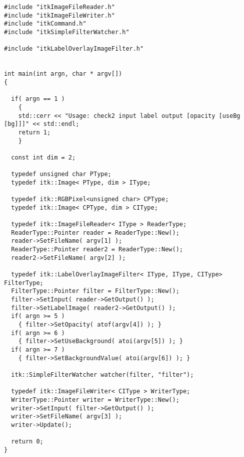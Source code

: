 \documentclass{InsightArticle}
\begin{document}
\small \begin{verbatim}
#include "itkImageFileReader.h"
#include "itkImageFileWriter.h"
#include "itkCommand.h"
#include "itkSimpleFilterWatcher.h"

#include "itkLabelOverlayImageFilter.h"


int main(int argn, char * argv[])
{

  if( argn == 1 )
    {
    std::cerr << "Usage: check2 input label output [opacity [useBg [bg]]]" << std::endl;
    return 1;
    }

  const int dim = 2;
  
  typedef unsigned char PType;
  typedef itk::Image< PType, dim > IType;

  typedef itk::RGBPixel<unsigned char> CPType;
  typedef itk::Image< CPType, dim > CIType;

  typedef itk::ImageFileReader< IType > ReaderType;
  ReaderType::Pointer reader = ReaderType::New();
  reader->SetFileName( argv[1] );
  ReaderType::Pointer reader2 = ReaderType::New();
  reader2->SetFileName( argv[2] );

  typedef itk::LabelOverlayImageFilter< IType, IType, CIType> FilterType;
  FilterType::Pointer filter = FilterType::New();
  filter->SetInput( reader->GetOutput() );
  filter->SetLabelImage( reader2->GetOutput() );
  if( argn >= 5 )
    { filter->SetOpacity( atof(argv[4]) ); }
  if( argn >= 6 )
    { filter->SetUseBackground( atoi(argv[5]) ); }
  if( argn >= 7 )
    { filter->SetBackgroundValue( atoi(argv[6]) ); }

  itk::SimpleFilterWatcher watcher(filter, "filter");

  typedef itk::ImageFileWriter< CIType > WriterType;
  WriterType::Pointer writer = WriterType::New();
  writer->SetInput( filter->GetOutput() );
  writer->SetFileName( argv[3] );
  writer->Update();

  return 0;
}

\end{verbatim} \normalsize



\end{document}
